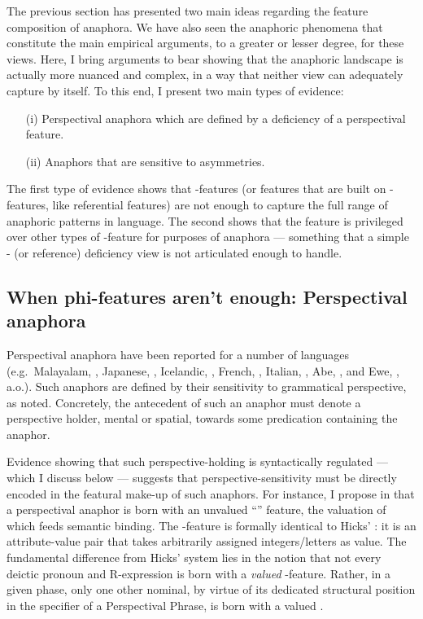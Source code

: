 \documentclass[output=paper, modfonts, nonflat]{langsci/langscibook}
\begin{document}
The previous section has presented two main ideas regarding the
feature composition of anaphora. We have also seen the anaphoric
phenomena that constitute the main empirical arguments, to a greater
or lesser degree, for these views. Here, I bring arguments to bear
showing that the anaphoric landscape is actually more nuanced and
complex, in a way that neither view can adequately capture by
itself. To this end, I present two main types of evidence:
\begin{itemize}
\item[(i)] Perspectival anaphora which are defined by a deficiency of
  a perspectival feature.
  \item[(ii)] Anaphors that are sensitive to \person{} asymmetries. 
  \end{itemize}
  The first type of evidence shows that \ph-features (or features that
  are built on \ph-features, like referential features) are not enough
  to capture the full range of anaphoric patterns in language. The
  second shows that the \person{} feature is privileged over other
  types of \ph-feature for purposes of anaphora --- something that a
  simple \ph- (or reference) deficiency view is not articulated enough
  to handle. 
  

 \subsection{When phi-features aren't enough: Perspectival anaphora}

 Perspectival anaphora have been reported for a number of languages
 (e.g.\ Malayalam, \citealp{jayaseelan:1997}, Japanese,
 \citealp{kuno:1987, nishigauchi:2014}, Icelandic,
 \citealp{hellan:1988, sigurdsson:1991}, French,
 \citealp{charnavel:2016}, Italian, \citealp{giorgi:2010}, Abe,
 \citealp{koopmansportiche:1989}, and Ewe, \citealp{pearson:2013},
 a.o.). Such anaphors are defined by their sensitivity to grammatical
 perspective, as noted. Concretely, the antecedent of such an anaphor
 must denote a perspective holder, mental or spatial, towards some
 predication containing the anaphor.

 Evidence showing that such perspective-holding is syntactically
 regulated --- which I discuss below --- suggests that
 perspective-sensitivity must be directly encoded in the featural
 make-up of such anaphors.  For instance, I propose in
 \citet{sundaresan:2012, sundaresan:2018} that a perspectival anaphor
 is born with an unvalued ``\dep'' feature, the valuation of which
 feeds semantic binding. The \dep-feature is formally identical to
 Hicks' \var: it is an attribute-value pair that takes arbitrarily
 assigned integers/letters as value.  The fundamental difference from
 Hicks' system lies in the notion that not every deictic pronoun and
 R-expression is born with a \emph{valued} \dep-feature. Rather, in a
 given phase, only one other nominal, by virtue of its dedicated
 structural position in the specifier of a Perspectival Phrase, is
 born with a valued \dep.
\end{document}
